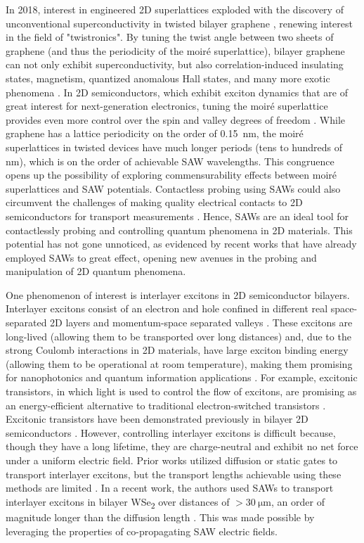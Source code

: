 \documentclass[double,12pt,1in]{beavtex}
\begin{document}
In 2018, interest in engineered 2D superlattices exploded with the discovery of unconventional superconductivity in twisted bilayer graphene \cite{cao_unconventional_2018}, renewing interest in the field of "twistronics". By tuning the twist angle between two sheets of graphene (and thus the periodicity of the moiré superlattice), bilayer graphene can not only exhibit superconductivity, but also correlation-induced insulating states, magnetism, quantized anomalous Hall states, and many more exotic phenomena \cite{andrei_graphene_2020}. In 2D semiconductors, which exhibit exciton dynamics that are of great interest for next-generation electronics, tuning the moiré superlattice provides even more control over the spin and valley degrees of freedom \cite{ciarrocchi_excitonic_2022}. While graphene has a lattice periodicity on the order of \SI{0.15}{\nano\meter}, the moiré superlattices in twisted devices have much longer periods (tens to hundreds of nm), which is on the order of achievable SAW wavelengths. This congruence opens up the possibility of exploring commensurability effects between moiré superlattices and SAW potentials. Contactless probing using SAWs could also circumvent the challenges of making quality electrical contacts to 2D semiconductors for transport measurements \cite{miao_recent_2022}. Hence, SAWs are an ideal tool for contactlessly probing and controlling quantum phenomena in 2D materials. This potential has not gone unnoticed, as evidenced by recent works that have already employed SAWs to great effect, opening new avenues in the probing and manipulation of 2D quantum phenomena.

One phenomenon of interest is interlayer excitons in 2D semiconductor bilayers. Interlayer excitons consist of an electron and hole confined in different real space-separated 2D layers and momentum-space separated valleys \cite{rivera_interlayer_2018}. These excitons are long-lived (allowing them to be transported over long distances) and, due to the strong Coulomb interactions in 2D materials, have large exciton binding energy (allowing them to be operational at room temperature), making them promising for nanophotonics and quantum information applications \cite{tran_evidence_2019}. For example, excitonic transistors, in which light is used to control the flow of excitons, are promising as an energy-efficient alternative to traditional electron-switched transistors \cite{kuznetsova_all-optical_2010}. Excitonic transistors have been demonstrated previously in bilayer 2D semiconductors \cite{liu_electrically_2020}. However, controlling interlayer excitons is difficult because, though they have a long lifetime, they are charge-neutral and exhibit no net force under a uniform electric field. Prior works utilized diffusion or static gates to transport interlayer excitons, but the transport lengths achievable using these methods are limited \cite{jauregui_electrical_2019,unuchek_room-temperature_2018,liu_electrically_2020}. In a recent work, the authors used SAWs to transport interlayer excitons in bilayer WSe\textsubscript{2} over distances of $> \SI{30}{\micro\meter}$, an order of magnitude longer than the diffusion length \cite{peng_long-range_2022}. This was made possible by leveraging the properties of co-propagating SAW electric fields.
\end{document}
